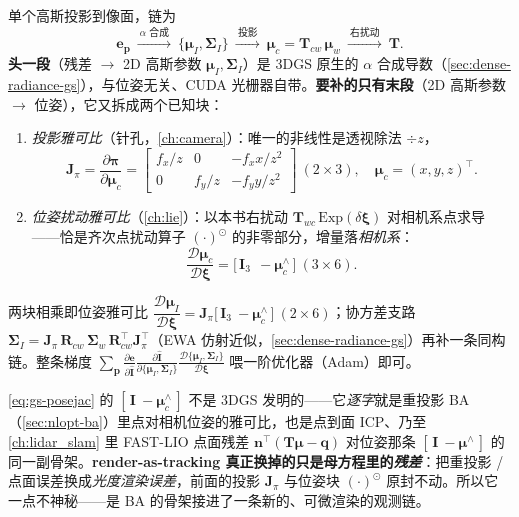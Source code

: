 \begin{derivation}[渲染对位姿的雅可比链]
单个高斯投影到像面，链为
\[
\mathbf e_{\mathbf p}\ \xrightarrow{\ \alpha\text{ 合成}\ }\ \{\boldsymbol\mu_I,\boldsymbol\Sigma_I\}\ \xrightarrow{\ \text{投影}\ }\ \boldsymbol\mu_c=\mathbf T_{cw}\,\boldsymbol\mu_w\ \xrightarrow{\ \text{右扰动}\ }\ \mathbf T .
\]
\textbf{头一段}（残差 $\to$ 2D 高斯参数 $\boldsymbol\mu_I,\boldsymbol\Sigma_I$）是 3DGS 原生的 $\alpha$ 合成导数（\cref{sec:dense-radiance-gs}），与位姿无关、CUDA 光栅器自带。\textbf{要补的只有末段}（2D 高斯参数 $\to$ 位姿），它又拆成两个已知块：
\begin{enumerate}
  \item \emph{投影雅可比}（针孔，\cref{ch:camera}）：唯一的非线性是透视除法 $\div z$，
  \begin{equation}
  \mathbf J_\pi=\frac{\partial\boldsymbol\pi}{\partial\boldsymbol\mu_c}=\begin{bmatrix}f_x/z & 0 & -f_x x/z^2\\[2pt] 0 & f_y/z & -f_y y/z^2\end{bmatrix}\ (2\times3),\quad \boldsymbol\mu_c=(x,y,z)^\top .
  \label{eq:gs-projjac}
  \end{equation}
  \item \emph{位姿扰动雅可比}（\cref{ch:lie}）：以本书右扰动 $\mathbf T_{wc}\,\mathrm{Exp}(\delta\boldsymbol\xi)$ 对相机系点求导——恰是齐次点扰动算子 $(\cdot)^\odot$ 的非零部分，增量落\emph{相机系}：
  \begin{equation}
  \frac{\mathcal D\boldsymbol\mu_c}{\mathcal D\boldsymbol\xi}=\big[\,\mathbf I_3\ \ -\boldsymbol\mu_c^\wedge\,\big]\ (3\times6).
  \label{eq:gs-posejac}
  \end{equation}
\end{enumerate}
两块相乘即位姿雅可比 $\dfrac{\mathcal D\boldsymbol\mu_I}{\mathcal D\boldsymbol\xi}=\mathbf J_\pi\big[\,\mathbf I_3\ -\boldsymbol\mu_c^\wedge\,\big]\ (2\times6)$；协方差支路 $\boldsymbol\Sigma_I=\mathbf J_\pi\,\mathbf R_{cw}\,\boldsymbol\Sigma_w\,\mathbf R_{cw}^\top\mathbf J_\pi^\top$（EWA 仿射近似，\cref{sec:dense-radiance-gs}）再补一条同构链。整条梯度 $\sum_{\mathbf p}\frac{\partial\mathbf e}{\partial\hat{\mathbf I}}\frac{\partial\hat{\mathbf I}}{\partial\{\boldsymbol\mu_I,\boldsymbol\Sigma_I\}}\frac{\mathcal D\{\boldsymbol\mu_I,\boldsymbol\Sigma_I\}}{\mathcal D\boldsymbol\xi}$ 喂一阶优化器（Adam）即可。
\end{derivation}

\begin{insight}
\cref{eq:gs-posejac} 的 $[\,\mathbf I\ -\boldsymbol\mu_c^\wedge\,]$ 不是 3DGS 发明的——它\emph{逐字}就是重投影 BA（\cref{sec:nlopt-ba}）里点对相机位姿的雅可比，也是点到面 ICP、乃至 \cref{ch:lidar_slam} 里 FAST-LIO 点面残差 $\mathbf n^\top(\mathbf T\boldsymbol\mu-\mathbf q)$ 对位姿那条 $[\,\mathbf I\ -\boldsymbol\mu^\wedge\,]$ 的同一副骨架。\textbf{render-as-tracking 真正换掉的只是母方程里的\emph{残差}}：把重投影 / 点面误差换成\emph{光度渲染误差}，前面的投影 $\mathbf J_\pi$ 与位姿块 $(\cdot)^\odot$ 原封不动。所以它一点不神秘——是 BA 的骨架接进了一条新的、可微渲染的观测链。
\end{insight}

